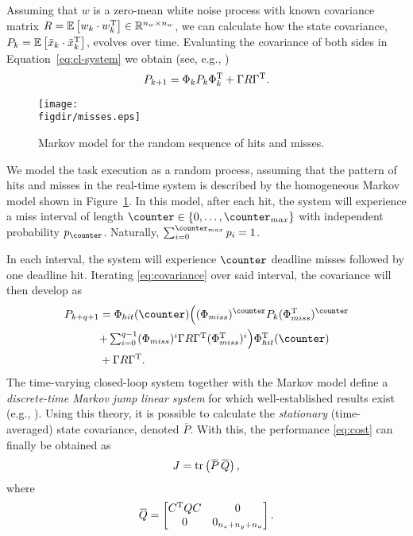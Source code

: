 Assuming that $w$ is a zero-mean white noise process with known covariance matrix $R = \mathbb{E}\left[ w_k \cdot w_k^{\mathrm{\small{T}}} \right] \in \mathbb{R}^{n_w \times n_w}$, we can calculate how the state covariance, $P_k = \mathbb{E}\left[ \tilde{x}_k\cdot \tilde{x}_k^{\mathrm{\small{T}}} \right]$, evolves over time.
Evaluating the covariance of both sides in Equation~\eqref{eq:cl-system} we obtain (see, e.g., \cite{AstWit:1984})
\begin{equation}
    \label{eq:covariance}
    P_{k+1} = \clmat{}_k P_k \clmat{}_k^{\T} + \clinp{} R \clinp{}^{\T} .
\end{equation}

\begin{figure}[t]
    \centerline{\texttt{[image: \\figdir/misses.eps]}}
    \caption{Markov model for the random sequence of hits and misses.}
    \label{fig:Markov}
\end{figure}

We model the task execution as a random process, assuming that the pattern of hits and misses in the real-time system is described by the homogeneous Markov model shown in Figure~\ref{fig:Markov}.
In this model, after each hit, the system will experience a miss interval of length $\counter \in \{0,\ldots,\counter_{max}\}$ with independent probability $p_\counter$. Naturally, $\sum_{i=0}^{\counter_{max}} p_i = 1$.

In each interval, the system will experience $\counter$ deadline misses followed by one deadline hit. Iterating \eqref{eq:covariance} over said interval, the covariance will then develop as
\begin{equation*}
    \label{eq:intervalP}
    \begin{aligned}
        P_{k+q+1} &= \clmat{}_{hit}(\counter)  \Bigl((\clmat{}_{miss})^\counter P_k (\clmat{}_{miss}^{\T})^\counter \Bigr.\\
        &\Bigl.+ \textstyle\sum_{i=0}^{q-1} (\clmat{}_{miss})^i \clinp{} R \clinp{}^{\T} (\clmat{}_{miss}^{\T})^i \Bigr)\clmat{}_{hit}^{\T}(\counter)  \\
        &+ \clinp{} R \clinp{}^{\T} .
    \end{aligned}
\end{equation*}
The time-varying closed-loop system together with the Markov model define a \emph{discrete-time Markov jump linear system} for which well-established results exist (e.g., \cite{Blair:1975,Nilsson:1998,Lincoln:2002}). Using this theory, it is possible to calculate the \emph{stationary} (time-averaged) state covariance, denoted $\overbar{P}$. With this, the performance \eqref{eq:cost} can finally be obtained as
\begin{equation*}
    J = \trace{ \overbar{P} \, \overbar{Q} },
\end{equation*}
where
\begin{equation*}
    \overbar{Q} = \begin{bmatrix}
        C^{\T}Q C & 0 \\ 0 & 0_{n_z+n_y+n_u}
    \end{bmatrix}.
\end{equation*}

